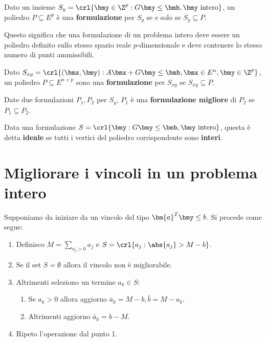 \documentclass[\main/main.tex]{subfiles}
\begin{document}
\begin{definition}[Formulazione]
    Dato un insieme \(S_y = \crl{\bmy \in \Z^p: G\bmy\leq \bmb, \bmy \text{ intero}}\), un poliedro \(P \subseteq E^p\) è una \textbf{formulazione} per \(S_y\) se e solo se \(S_y \subseteq P\).

    Questo significa che una formulazione di un problema intero deve essere un poliedro definito sullo stesso spazio reale \(p\)-dimensionale e deve contenere lo stesso numero di punti ammissibili.
\end{definition}

\begin{definition}
    Dato \(S_{xy} = \crl{(\bmx, \bmy): A\bmx + G\bmy \leq \bmb, \bmx \in E^n, \bmy \in \Z^p}\), un poliedro \(P\subseteq E^{n+p}\) sono una \textbf{formulazione} per \(S_{xy}\) se \(S_{xy} \subseteq P\).
\end{definition}

\begin{definition}
    Date due formulazioni \(P_1, P_2\) per \(S_y\), \(P_1\) è una \textbf{formulazione migliore} di \(P_2\) se \(P_1 \subseteq P_2\).
\end{definition}

\begin{definition}
    Data una formulazione \(S = \crl{\bmy: G\bmy \leq \bmb, \bmy \text{ intero}}\), questa è detta \textbf{ideale} se tutti i vertici del poliedro corrispondente sono \textbf{interi}.
\end{definition}

\section{Migliorare i vincoli in un problema intero}
Supponiamo da iniziare da un vincolo del tipo \(\bm{a}^T\bmy\leq b \). Si procede come segue:

\begin{enumerate}
    \item Definisco \(M = \sum_{a_j>0}a_j\) e \(S = \crl{a_j: \abs{a_j}>M-b}\).
    \item Se il set \(S=\emptyset \) allora il vincolo non è migliorabile.
    \item Altrimenti seleziono un termine \(a_k \in S\):
    \begin{enumerate}
        \item Se \(a_k>0\) allora aggiorno \(\bar{a}_k = M - b, \bar{b} = M-a_k\).
        \item Altrimenti aggiorno \(\bar{a}_k = b - M\).
    \end{enumerate}
    \item Ripeto l'operazione dal punto 1.
\end{enumerate}
\end{document}
